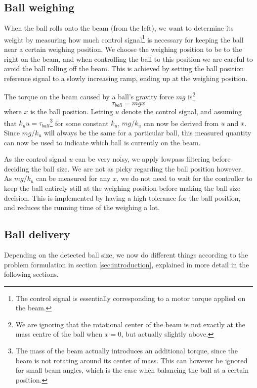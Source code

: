 \subsection{Ball weighing}\label{sec:ball_weighing}
When the ball rolls onto the beam (from the left), we want to determine its weight by measuring how much control signal\footnote{The control signal is essentially corresponding to a motor torque applied on the beam.} is necessary for keeping the ball near a certain weighing position.
We choose the weighing position to be to the right on the beam, and when controlling the ball to this position we are careful to avoid the ball rolling off the beam.
This is achieved by setting the ball position reference signal to a slowly increasing ramp, ending up at the weighing position.

The torque on the beam caused by a ball's gravity force $mg$ is\footnote{We are ignoring that the rotational center of the beam is not exactly at the mass centre of the ball when $x=0$, but actually slightly above.}
\[
\tau_{ball} = mgx
\]
where $x$ is the ball position. Letting $u$ denote the control signal, and assuming that $k_u u = \tau_{ball}$\footnote{The mass of the beam actually introduces an additional torque, since the beam is not rotating around its center of mass.
This can however be ignored for small beam angles, which is the case when balancing the ball at a certain position.} for some constant $k_u$, $mg/k_u$ can now be derived from $u$ and $x$.
Since $mg/k_u$ will always be the same for a particular ball, this measured quantity can now be used to indicate which ball is currently on the beam.

As the control signal $u$ can be very noisy, we apply lowpass filtering before deciding the ball size.
We are not as picky regarding the ball position however.
As $mg/k_u$ can be measured for any $x$, we do not need to wait for the controller to keep the ball entirely still at the weighing position before making the ball size decision.
This is implemented by having a high tolerance for the ball position, and reduces the running time of the weighing a lot.

\subsection{Ball delivery}\label{sec:ball_delivery}
Depending on the detected ball size, we now do different things according to the problem formulation in section \ref{sec:introduction}, explained in more detail in the following sections.

